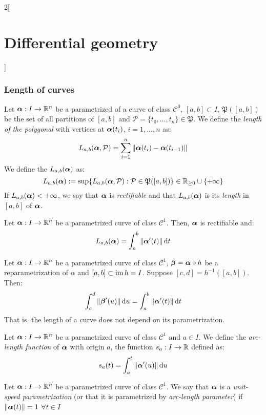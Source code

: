 \documentclass[../../../main.tex]{subfiles}
\begin{document}
\begin{multicols}{2}[\section{Differential geometry}]
  \subsubsection{Length of curves}
  \begin{definition}
    Let $\boldsymbol{\mathrm{\alpha}}:I\rightarrow\mathbb{R}^n$ be a parametrized of a curve of class $\mathcal{C}^0$, $[a,b]\subset I$, $\mathfrak{P}([a,b])$ be the set of all partitions of $[a,b]$ and $\mathcal{P}=\{t_0,\ldots,t_n\}\in\mathfrak{P}$. We define the \emph{length of the polygonal} with vertices at $\boldsymbol{\mathrm{\alpha}}(t_i)$, $i=1,\ldots,n$ as: $$L_{a,b}(\boldsymbol{\mathrm{\alpha}},\mathcal{P})=\sum_{i=1}^n\|\boldsymbol{\mathrm{\alpha}}(t_i)-\boldsymbol{\mathrm{\alpha}}(t_{i-1})\|$$ We define the $L_{a,b}(\boldsymbol{\mathrm{\alpha}})$ as:
    $$L_{a,b}(\boldsymbol{\mathrm{\alpha}}):=\sup\{L_{a,b}(\boldsymbol{\mathrm{\alpha}},\mathcal{P}):\mathcal{P}\in\mathfrak{P}([a,b])\}\in\mathbb{R}_{\geq 0}\cup\{+\infty\}$$ If $L_{a,b}(\boldsymbol{\mathrm{\alpha}})<+\infty$, we say that $\boldsymbol{\mathrm{\alpha}}$ is \emph{rectifiable} and that $L_{a,b}(\boldsymbol{\mathrm{\alpha}})$ is its \emph{length} in $[a,b]$ of $\boldsymbol{\mathrm{\alpha}}$.
  \end{definition}
  \begin{proposition}
    Let $\boldsymbol{\mathrm{\alpha}}:I\rightarrow\mathbb{R}^n$ be a parametrized curve of class $\mathcal{C}^1$. Then, $\boldsymbol{\mathrm{\alpha}}$ is rectifiable and: $$L_{a,b}(\boldsymbol{\mathrm{\alpha}})=\int_a^b\|\boldsymbol{\mathrm{\alpha}}'(t)\|\dd{t}$$
  \end{proposition}
  \begin{proposition}
    Let $\boldsymbol{\mathrm{\alpha}}:I\rightarrow\mathbb{R}^n$ be a parametrized curve of class $\mathcal{C}^1$, $\boldsymbol{\mathrm{\beta}}=\boldsymbol{\mathrm{\alpha}}\circ h$ be a reparametrization of $\alpha$ and $[a,b]\subset \operatorname{im} h=I$. Suppose $[c,d]=h^{-1}([a,b])$. Then: $$\int_c^d\|\boldsymbol{\mathrm{\beta}}'(u)\|\dd{u}=\int_a^b\|\boldsymbol{\mathrm{\alpha}}'(t)\|\dd{t}$$ That is, the length of a curve does not depend on its parametrization.
  \end{proposition}
  \begin{definition}
    Let $\boldsymbol{\mathrm{\alpha}}:I\rightarrow\mathbb{R}^n$ be a parametrized curve of class $\mathcal{C}^1$ and $a\in I$. We define the \emph{arc-length function} of $\boldsymbol{\mathrm{\alpha}}$ with origin $a$, the function $s_a:I\rightarrow\mathbb{R}$ defined as: $$s_a(t)=\int_a^t\|\boldsymbol{\mathrm{\alpha}}'(u)\|\dd{u}$$
  \end{definition}
  \begin{definition}
    Let $\boldsymbol{\mathrm{\alpha}}:I\rightarrow\mathbb{R}^n$ be a parametrized curve of class $\mathcal{C}^1$. We say that $\boldsymbol{\mathrm{\alpha}}$ is a \emph{unit-speed parametrization} (or that it is parametrized by \emph{arc-length parameter}) if $\|\boldsymbol{\mathrm{\alpha}}(t)\|=1$ $\forall t\in I$
  \end{definition}

\end{multicols}
\end{document}
